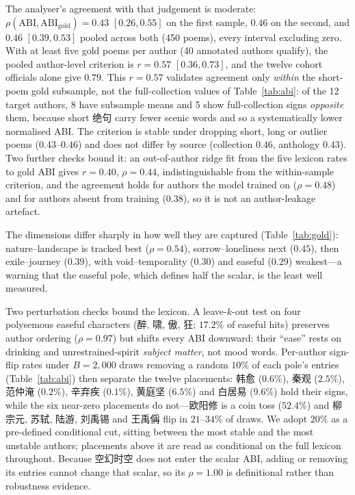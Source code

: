 \documentclass[10pt]{article}
\begin{document}
The analyser's agreement with that judgement is moderate:
$\rho(\mathrm{ABI},\mathrm{ABI}_{\mathrm{gold}}){=}0.43$ $[0.26,0.55]$ on the first
sample, $0.46$ on the second, and $0.46$ $[0.39,0.53]$ pooled across both (450
poems), every interval excluding zero. With at least five gold poems per author (40
annotated authors qualify), the pooled author-level criterion is $r{=}0.57$
$[0.36,0.73]$, and the twelve cohort officials alone give $0.79$. This $r{=}0.57$
validates agreement only \emph{within} the short-poem gold subsample, not the
full-collection values of Table~\ref{tab:abi}: of the 12 target authors, 8 have
subsample means and 5 show full-collection signs \emph{opposite} them, because short
绝句 carry fewer scenic words and so a systematically lower normalised ABI. The
criterion is stable under dropping short, long or outlier poems ($0.43$--$0.46$) and
does not differ by source (collection $0.46$, anthology $0.43$). Two further checks
bound it: an out-of-author ridge fit from the five lexicon rates to gold ABI gives
$r{=}0.40$, $\rho{=}0.44$, indistinguishable from the within-sample criterion, and the
agreement holds for authors the model trained on ($\rho{=}0.48$) and for authors
absent from training ($0.38$), so it is not an author-leakage artefact.

The dimensions differ sharply in how well they are captured
(Table~\ref{tab:gold}): nature--landscape is tracked best ($\rho{=}0.54$),
sorrow--loneliness next ($0.45$), then exile--journey ($0.39$), with void--temporality
($0.30$) and easeful ($0.29$) weakest---a warning that the easeful pole, which defines
half the scalar, is the least well measured.

Two perturbation checks bound the lexicon. A leave-$k$-out test on four polysemous
easeful characters (醉, 啸, 傲, 狂; $17.2\%$ of easeful hits) preserves author
ordering ($\rho{=}0.97$) but shifts every ABI downward: their ``ease'' rests on
drinking and unrestrained-spirit \emph{subject matter}, not mood words. Per-author
sign-flip rates under $B{=}2{,}000$ draws removing a random $10\%$ of each pole's
entries (Table~\ref{tab:abi}) then separate the twelve placements: 韩愈 ($0.6\%$),
秦观 ($2.5\%$), 范仲淹 ($0.2\%$), 辛弃疾 ($0.1\%$), 黄庭坚 ($6.5\%$) and 白居易
($9.6\%$) hold their signs, while the six near-zero placements do not---欧阳修 is a
coin toss ($52.4\%$) and 柳宗元, 苏轼, 陆游, 刘禹锡 and 王禹偁 flip in $21$--$34\%$ of
draws. We adopt $20\%$ as a pre-defined conditional cut, sitting between the most
stable and the most unstable authors; placements above it are read as conditional on
the full lexicon throughout. Because 空幻时空 does not enter the scalar ABI, adding or
removing its entries cannot change that scalar, so its $\rho{=}1.00$ is definitional
rather than robustness evidence.
\end{document}
